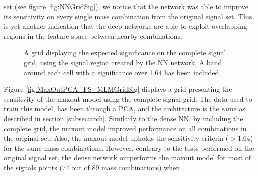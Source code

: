 set (see figure \ref{fig:NNGridSig}), we notice that the network was able to improve its sensitivity on every single mass combination from the original signal set. This is yet another 
indication that the deep networks are able to exploit overlapping regions in the feature space between nearby combinations.\\
\begin{figure}
    \caption{A grid displaying the expected significance on the complete signal grid, using the signal region 
    created by the \acs{NN} network. A band around each cell with a significance over 1.64 has been included.}
    \label{fig:NN_FS_MLMGridSig}
\end{figure}
Figure \ref{fig:MaxOutPCA_FS_MLMGridSig} displays a grid presenting the sensitivity of the maxout model using the complete signal grid.
The data used to train this model, has been through a \ac{PCA}, and the architecture is the same as described in section \ref{subsec:arch}.
Similarly to the dense \ac{NN}, by including the complete grid, the maxout model improved performance on all combinations in the original set. 
Also, the maxout model upholds the sensitivity criteria ($>1.64$) for the same mass combinations. However, contrary to the tests performed on 
the original signal set, the dense network outperforms the maxout model for most of the signals points (74 out of 89 mass combinations) when 
